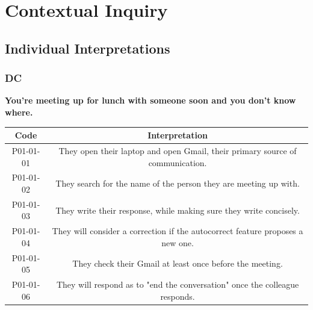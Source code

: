 \documentclass[acmsmall,screen,authorversion,nonacm]{acmart}
\begin{document}
\section{Contextual Inquiry}
\label{appendix:contextual_inquiry}

\subsection{Individual Interpretations}

\subsubsection{DC}
\label{C-DC}

\begin{center}
\textbf{You’re meeting up for lunch with someone soon and you don’t know where.}
\begin{tabular}{|c|c|}
\hline
\textbf{Code} & \textbf{Interpretation}                                                        \\ \hline
P01-01-01 & They open their laptop and open Gmail, their primary source of communication.  \\ \hline
P01-01-02 & They search for the name of the person they are meeting up with.               \\ \hline
P01-01-03 & They write their response, while making sure they write concisely.             \\ \hline
P01-01-04 & They will consider a correction if the autocorrect feature proposes a new one. \\ \hline
P01-01-05 & They check their Gmail at least once before the meeting.                       \\ \hline
P01-01-06 & They will respond as to "end the conversation" once the colleague responds.    \\ \hline
\end{tabular}
\end{center}

\vspace{5pt}
\end{document}
